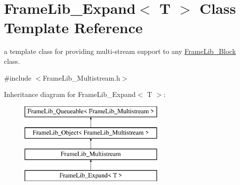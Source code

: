 \hypertarget{class_frame_lib___expand}{}\section{Frame\+Lib\+\_\+\+Expand$<$ T $>$ Class Template Reference}
\label{class_frame_lib___expand}


a template class for providing multi-\/stream support to any \hyperlink{class_frame_lib___block}{Frame\+Lib\+\_\+\+Block} class.  




{\ttfamily \#include $<$Frame\+Lib\+\_\+\+Multistream.\+h$>$}

Inheritance diagram for Frame\+Lib\+\_\+\+Expand$<$ T $>$\+:\begin{figure}[H]
\begin{center}
\leavevmode
\includegraphics[height=4.000000cm]{class_frame_lib___expand}
\end{center}
\end{figure}
